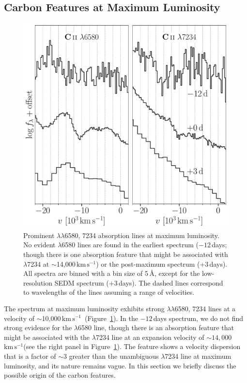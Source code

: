 \documentclass[twocolumn]{aastex631}
\newcommand{\sn}{SN\,2022joj}
\newcommand{\kms}{$\mathrm{km}\,\mathrm{s}^{-1}$}
\begin{document}
\begin{CJK*}{UTF8}{gbsn}
\subsection{Carbon Features at Maximum Luminosity}\label{sec:disc_C_II}
\begin{figure}
    \centering
    \includegraphics[width=\linewidth]{C_II.pdf}
    \caption{Prominent  $\lambda\lambda$6580, 7234 absorption lines at maximum luminosity. No evident  $\lambda$6580 lines are found in the earliest spectrum ($-12$\,days; though there is one absorption feature that might be associated with  $\lambda$7234 at $\sim$14,000\,\kms) or the post-maximum spectrum ($+3$\,days). All spectra are binned with a bin size of 5\,\AA, except for the low-resolution SEDM spectrum ($+3$\,days). The dashed lines correspond to wavelengths of the  lines assuming a range of velocities.}
    \label{fig:C_II}
\end{figure}
The spectrum at maximum luminosity exhibits strong  $\lambda\lambda$6580, 7234 lines at a velocity of $\sim$10,000\,\kms\  (Figure~\ref{fig:C_II}). In the $-12$\,days spectrum, we do not find strong evidence for the  $\lambda$6580 line, though there is an absorption feature that might be associated with the  $\lambda$7234 line at an expansion velocity of $\sim$$14,000$\,\kms (see the right panel in Figure~\ref{fig:C_II}). The feature shows a velocity dispersion that is a factor of $\sim$3 greater than the unambiguous  $\lambda$7234 line at maximum luminosity, and its nature remains vague. %
In this section we briefly discuss the possible origin of the carbon features.


\end{CJK*}
\end{document}
